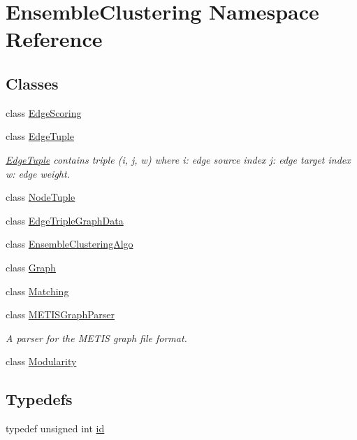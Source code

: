 \hypertarget{namespace_ensemble_clustering}{\section{Ensemble\-Clustering Namespace Reference}
\label{namespace_ensemble_clustering}
}
\subsection*{Classes}
\begin{DoxyCompactItemize}
\item 
class \hyperlink{class_ensemble_clustering_1_1_edge_scoring}{Edge\-Scoring}
\item 
class \hyperlink{class_ensemble_clustering_1_1_edge_tuple}{Edge\-Tuple}
\begin{DoxyCompactList}\small\item\em \hyperlink{class_ensemble_clustering_1_1_edge_tuple}{Edge\-Tuple} contains triple (i, j, w) where i\-: edge source index j\-: edge target index w\-: edge weight. \end{DoxyCompactList}\item 
class \hyperlink{class_ensemble_clustering_1_1_node_tuple}{Node\-Tuple}
\item 
class \hyperlink{class_ensemble_clustering_1_1_edge_triple_graph_data}{Edge\-Triple\-Graph\-Data}
\item 
class \hyperlink{class_ensemble_clustering_1_1_ensemble_clustering_algo}{Ensemble\-Clustering\-Algo}
\item 
class \hyperlink{class_ensemble_clustering_1_1_graph}{Graph}
\item 
class \hyperlink{class_ensemble_clustering_1_1_matching}{Matching}
\item 
class \hyperlink{class_ensemble_clustering_1_1_m_e_t_i_s_graph_parser}{M\-E\-T\-I\-S\-Graph\-Parser}
\begin{DoxyCompactList}\small\item\em A parser for the M\-E\-T\-I\-S graph file format. \end{DoxyCompactList}\item 
class \hyperlink{class_ensemble_clustering_1_1_modularity}{Modularity}
\end{DoxyCompactItemize}
\subsection*{Typedefs}
\begin{DoxyCompactItemize}
\item 
typedef unsigned int \hyperlink{namespace_ensemble_clustering_a3228848abf8dfd6602f3b08dd459ea20}{id}
\end{DoxyCompactItemize}


